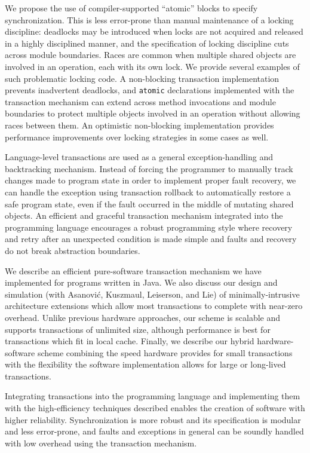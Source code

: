 \documentclass[twoside,twocolumn,notitlepage,letterpaper,9pt]{article}
\begin{document}
We propose the use of compiler-supported ``atomic'' blocks to
specify synchronization.  This is less error-prone than manual
maintenance of a locking discipline: deadlocks may be introduced when
locks are not acquired and released in a highly disciplined manner,
and the specification of locking discipline cuts across module
boundaries.  Races are common when multiple shared objects are
involved in an operation, each with its own lock.  We provide several
examples of such problematic locking code.  A non-blocking transaction
implementation prevents inadvertent deadlocks, and \texttt{atomic}
declarations implemented with the transaction mechanism can extend
across method invocations and module boundaries to protect multiple
objects involved in an operation without allowing races between them.
An optimistic non-blocking implementation provides performance
improvements over locking strategies in some cases as well.

Language-level transactions are used as a general
exception-handling and backtracking mechanism.  Instead of forcing the
programmer to manually track changes made to program state in order to
implement proper fault recovery, we can handle the exception using
transaction rollback to automatically restore a safe program state,
even if the fault occurred in the middle of mutating shared objects.
An efficient and graceful transaction mechanism integrated into the
programming language encourages a robust programming style where
recovery and retry after an unexpected condition is made simple and
faults and recovery do not break abstraction boundaries.

We describe an efficient pure-software transaction mechanism we have
implemented for programs written in Java.  We also discuss our design
and simulation (with Asanovi\'c, Kuszmaul, Leiserson, and Lie) of
minimally-intrusive architecture extensions which allow most
transactions to complete with near-zero overhead.  Unlike previous
hardware approaches, our scheme is scalable and supports transactions
of unlimited size, although performance is best for transactions which
fit in local cache.  Finally, we describe our hybrid hardware-software
scheme combining the speed hardware provides for small
transactions with the flexibility the software implementation allows
for large or long-lived transactions.

Integrating transactions into the programming language and
implementing them with the high-efficiency techniques described
enables the creation of software with higher reliability.
Synchronization is more robust and its specification is modular and less
error-prone, and faults and exceptions in general can be
soundly handled with low overhead using the transaction mechanism.

%
%
\end{document}
